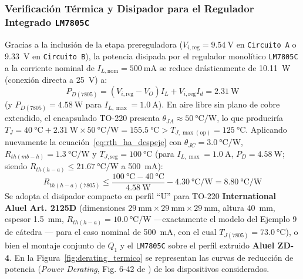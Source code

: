 \subsubsection{Verificación Térmica y Disipador para el Regulador Integrado \texttt{LM7805C}}
Gracias a la inclusión de la etapa prereguladora ($V_{i,\text{reg}} = \SI{9,54}{\volt}$ en \texttt{Circuito A} o \SI{9,33}{\volt} en \texttt{Circuito B}), la potencia disipada por el regulador monolítico \texttt{LM7805C} a la corriente nominal de $I_{L,\text{nom}} = \SI{500}{\milli\ampere}$ se reduce drásticamente de \SI{10,11}{\watt} (conexión directa a \SI{25}{\volt}) a:
\begin{equation}
    P_{D(\text{7805})} = \left(V_{i,\text{reg}} - V_O\right) I_L + V_{i,\text{reg}} I_d = \SI{2,31}{\watt}
    \label{eq:pd_7805_nom}
\end{equation}
(y $P_{D(\text{7805})} = \SI{4,58}{\watt}$ para $I_{L,\max} = \SI{1,0}{\ampere}$). En aire libre sin plano de cobre extendido, el encapsulado TO-220 presenta $\theta_{JA} \approx \SI{50}{\celsius\per\watt}$, lo que produciría $T_J = \SI{40}{\celsius} + \SI{2,31}{\watt} \times \SI{50}{\celsius\per\watt} = \SI{155,5}{\celsius} > T_{J,\max(\text{op})} = \SI{125}{\celsius}$. Aplicando nuevamente la ecuación~\eqref{eq:rth_ha_despeje} con $\theta_{JC} = \SI{3,0}{\celsius\per\watt}$, $R_{th(mb-h)} = \SI{1,3}{\celsius\per\watt}$ y $T_{J,\text{seg}} = \SI{100}{\celsius}$ (para $I_{L,\max} = \SI{1,0}{\ampere}$, $P_D = \SI{4,58}{\watt}$; siendo $R_{th(h-a)} \le \SI{21,67}{\celsius\per\watt}$ a \SI{500}{\milli\ampere}):
\begin{equation}
    R_{th(h-a)(\text{7805})} \le \frac{\SI{100}{\celsius} - \SI{40}{\celsius}}{\SI{4,58}{\watt}} - \SI{4,30}{\celsius\per\watt} = \SI{8,80}{\celsius\per\watt}
    \label{eq:rth_ha_7805}
\end{equation}
Se adopta el disipador compacto en perfil ``U'' para TO-220 \textbf{International Aluel Art. 2125D} (dimensiones $\SI{29}{\milli\meter} \times \SI{29}{\milli\meter} \times \SI{29}{\milli\meter}$, altura \SI{40}{\milli\meter}, espesor \SI{1,5}{\milli\meter}, $R_{th(h-a)} = \SI{10,0}{\celsius\per\watt}$ ---exactamente el modelo del Ejemplo 9 de cátedra \cite{gonzalez_p2}--- para el caso nominal de \SI{500}{\milli\ampere}, con el cual $T_{J(\text{7805})} = \SI{73,0}{\celsius}$), o bien el montaje conjunto de $Q_1$ y el \texttt{LM7805C} sobre el perfil extruido \textbf{Aluel ZD-4}. En la Figura~\ref{fig:derating_termico} se representan las curvas de reducción de potencia (\emph{Power Derating}, Fig. 6-42 de \cite{gonzalez_p2}) de los dispositivos considerados.

